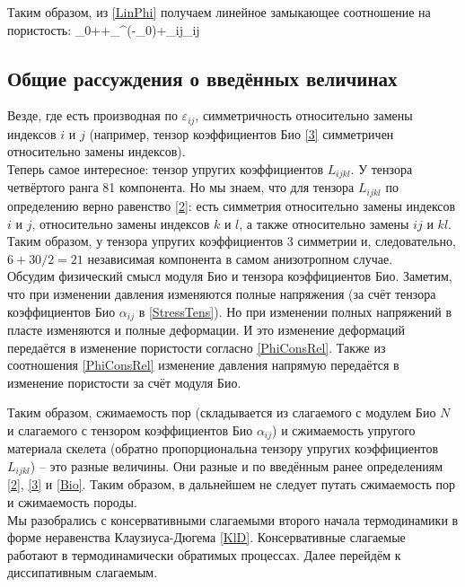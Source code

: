 \documentclass[main.tex]{subfiles}
\begin{document}
Таким образом, из \eqref{LinPhi} получаем линейное замыкающее соотношение на пористость:
\beq\label{PhiConsRel}
\varphi\approx\varphi_0++\alpha_\theta^\varphi\left(\theta-\theta_0\right)+\alpha_{ij}\varepsilon_{ij}
\eeq

\subsection{Общие рассуждения о введённых величинах}
Везде, где есть производная по $\varepsilon_{ij}$, симметричность относительно замены индексов $i$ и $j$ (например, тензор коэффициентов Био \eqref{3} симметричен относительно замены индексов).\\

Теперь самое интересное: тензор упругих коэффициентов $L_{ijkl}$. У тензора четвёртого ранга 81 компонента. Но мы знаем, что для тензора $L_{ijkl}$ по определению верно равенство \eqref{2}: есть симметрия относительно замены индексов $i$ и $j$, относительно замены индексов $k$ и $l$, а также относительно замены $ij$ и $kl$. Таким образом, у тензора упругих коэффициентов 3 симметрии и, следовательно, $6+30/2=21$ независимая компонента в самом анизотропном случае.\\

Обсудим физический смысл модуля Био и тензора коэффициентов Био. Заметим, что при изменении давления изменяются полные напряжения (за счёт тензора коэффициентов Био $\alpha_{ij}$ в \eqref{StressTens}). Но при изменении полных напряжений  в пласте изменяются и полные деформации. И это изменение деформаций передаётся в изменение пористости согласно \eqref{PhiConsRel}. Также из соотношения \eqref{PhiConsRel} изменение давления напрямую передаётся в изменение пористости за счёт модуля Био.

Таким образом, сжимаемость пор (складывается из слагаемого с модулем Био $N$ и слагаемого с тензором коэффициентов Био $\alpha_{ij}$) и сжимаемость упругого материала скелета (обратно пропорциональна тензору упругих коэффициентов $L_{ijkl}$) -- это разные величины. Они разные и по введённым ранее определениям \eqref{2}, \eqref{3} и \eqref{Bio}. Таким образом, в дальнейшем не следует путать сжимаемость пор и сжимаемость породы. \\

Мы разобрались с консервативными слагаемыми второго начала термодинамики в форме неравенства Клаузиуса-Дюгема \eqref{KlD}. Консервативные слагаемые работают в термодинамически обратимых процессах. Далее перейдём к диссипативным слагаемым.
\end{document}
